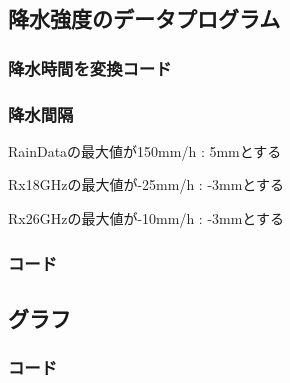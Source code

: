 \documentclass[a4paper,11pt,titlepage]{jarticle}
\begin{document}
\subsection{降水強度のデータプログラム}
\subsubsection{降水時間を変換コード}


\subsubsection{降水間隔}
RainDataの最大値が150mm/h : 5mmとする\par
Rx18GHzの最大値が-25mm/h : -3mmとする\par
Rx26GHzの最大値が-10mm/h : -3mmとする\par

\subsubsection{コード}





\subsection{グラフ}
\subsubsection{コード}



\end{document}
